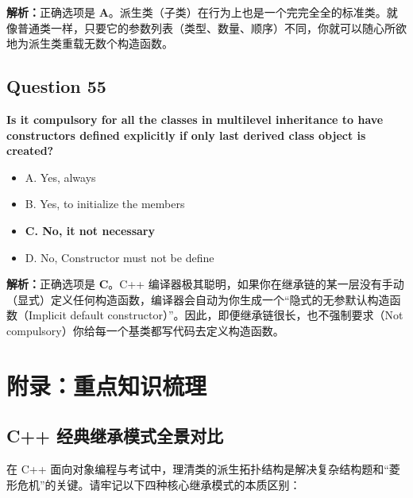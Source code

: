 \documentclass[11pt, a4paper]{article}
\begin{document}
\textbf{解析：}正确选项是 \textbf{A}。派生类（子类）在行为上也是一个完完全全的标准类。就像普通类一样，只要它的参数列表（类型、数量、顺序）不同，你就可以随心所欲地为派生类重载无数个构造函数。


\subsection*{Question 55}
\textbf{Is it compulsory for all the classes in multilevel inheritance to have constructors defined explicitly if only last derived class object is created?}
\begin{itemize}
    \item A. Yes, always
    \item B. Yes, to initialize the members
    \item \textbf{C. No, it not necessary}
    \item D. No, Constructor must not be define
\end{itemize}

\textbf{解析：}正确选项是 \textbf{C}。C++ 编译器极其聪明，如果你在继承链的某一层没有手动（显式）定义任何构造函数，编译器会自动为你生成一个“隐式的无参默认构造函数（Implicit default constructor）”。因此，即便继承链很长，也不强制要求（Not compulsory）你给每一个基类都写代码去定义构造函数。
\newpage %
\section*{附录：重点知识梳理}
\subsection*{C++ 经典继承模式全景对比}

在 C++ 面向对象编程与考试中，理清类的派生拓扑结构是解决复杂结构题和“菱形危机”的关键。请牢记以下四种核心继承模式的本质区别：

\vspace{1em} %
\end{document}
